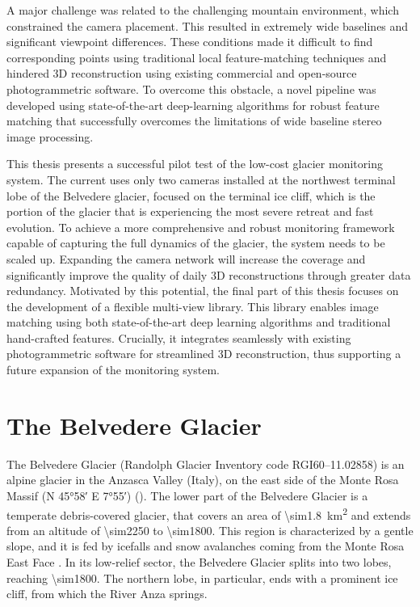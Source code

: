A major challenge was related to the challenging mountain environment, which constrained the camera placement.
This resulted in extremely wide baselines and significant viewpoint differences.  
These conditions made it difficult to find corresponding points using traditional local feature-matching techniques and hindered 3D reconstruction using existing commercial and open-source photogrammetric software.
To overcome this obstacle, a novel pipeline was developed using state-of-the-art deep-learning algorithms for robust feature matching that successfully overcomes the limitations of wide baseline stereo image processing.

This thesis presents a successful pilot test of the low-cost glacier monitoring system.
The current uses only two cameras installed at the northwest terminal lobe of the Belvedere glacier, focused on the terminal ice cliff, which is the portion of the glacier that is experiencing the most severe retreat and fast evolution. 
To achieve a more comprehensive and robust monitoring framework capable of capturing the full dynamics of the glacier, the system needs to be scaled up. 
Expanding the camera network will increase the coverage and significantly improve the quality of daily 3D reconstructions through greater data redundancy.
Motivated by this potential, the final part of this thesis focuses on the development of a flexible multi-view library. 
This library enables image matching using both state-of-the-art deep learning algorithms and traditional hand-crafted features. 
Crucially, it integrates seamlessly with existing photogrammetric software for streamlined 3D reconstruction, thus supporting a future expansion of the monitoring system.

\section{The Belvedere Glacier}\label{sec:1:belvedereglacier}

The Belvedere Glacier (Randolph Glacier Inventory code RGI60--11.02858) is an alpine
glacier in the Anzasca Valley (Italy), on the east side of the Monte Rosa Massif (N
\ang{45;58} E \ang{7;55}) ().
The lower part of the Belvedere Glacier is a temperate debris-covered glacier, that
covers an area of \SI{\sim1.8}{\kilo\meter\squared} and extends from an altitude of \SI{\sim2250}{\masl} to \SI{\sim1800}{\masl}.
This region is characterized by a gentle slope, and it is fed by icefalls and snow
avalanches coming from the Monte Rosa East Face \citep{Haeberli2002}. 
In its low-relief sector, the Belvedere Glacier splits into two lobes, reaching \SI{\sim1800}{\masl}.
The northern lobe, in particular, ends with a prominent ice cliff, from which the River
Anza springs.

